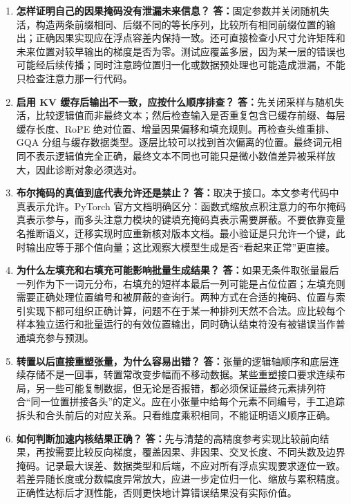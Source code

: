\documentclass[UTF8,12pt,a4paper,fontset=fandol]{ctexart}
\begin{document}
\begin{enumerate}[resume*=trquestions]
\item \textbf{怎样证明自己的因果掩码没有泄漏未来信息？}
\textbf{答：}固定参数并关闭随机失活，构造两条前缀相同、后缀不同的等长序列，比较所有相同前缀位置的输出；正确因果实现应在浮点容差内保持一致。还可直接检查小尺寸允许矩阵和未来位置对较早输出的梯度是否为零。测试应覆盖多层，因为某一层的错误也可能经后续传播；同时注意跨位置归一化或数据预处理也可能造成泄漏，不能只检查注意力那一行代码。

\item \textbf{启用 KV 缓存后输出不一致，应按什么顺序排查？}
\textbf{答：}先关闭采样与随机失活，比较逻辑值而非最终文本；然后检查输入是否重复包含已缓存前缀、每层缓存长度、RoPE 绝对位置、增量因果偏移和填充规则。再检查头维重排、GQA 分组与缓存数据类型。逐层比较可以找到首次偏离的位置。最终词元相同不表示逻辑值完全正确，最终文本不同也可能只是微小数值差异被采样放大，因此诊断对象必须选对。

\item \textbf{布尔掩码的真值到底代表允许还是禁止？}
\textbf{答：}取决于接口。本文参考代码中真表示允许。PyTorch 官方文档明确区分：函数式缩放点积注意力的布尔掩码真表示参与，而多头注意力模块的键填充掩码真表示需要屏蔽\cite{pytorchsdpa}。不要依靠变量名推断语义，迁移实现时应重新核对版本文档。最小验证是只允许一个键，此时输出应等于那个值向量；这比观察大模型生成是否“看起来正常”更直接。

\item \textbf{为什么左填充和右填充可能影响批量生成结果？}
\textbf{答：}如果无条件取张量最后一列作为下一词元分布，右填充的短样本最后一列可能是占位位置；左填充则需要正确处理位置编号和被屏蔽的查询行。两种方式在合适的掩码、位置与索引实现下都可组织正确计算，问题不在于某一种排列天然不合法。应比较每个样本独立运行和批量运行的有效位置输出，同时确认结束符没有被错误当作普通填充参与预测。

\item \textbf{转置以后直接重塑张量，为什么容易出错？}
\textbf{答：}张量的逻辑轴顺序和底层连续存储不是一回事，转置常改变步幅而不移动数据。某些重塑接口要求连续布局，另一些可能复制数据，但无论是否报错，都必须保证最终元素排列符合“同一位置拼接各头”的定义。应在小张量中给每个元素不同编号，手工追踪拆头和合头前后的对应关系。只看维度乘积相同，不能证明语义顺序正确。

\item \textbf{如何判断加速内核结果正确？}
\textbf{答：}先与清楚的高精度参考实现比较前向结果，再按需要比较反向梯度，覆盖因果、非因果、交叉长度、不同头数及边界掩码。记录最大误差、数据类型和后端，不应对所有浮点实现要求逐位一致。若差异随长度或分数幅度异常放大，应进一步定位归一化、缩放与累积精度。正确性达标后才测性能，否则更快地计算错误结果没有实际价值。


\end{enumerate}
\end{document}
